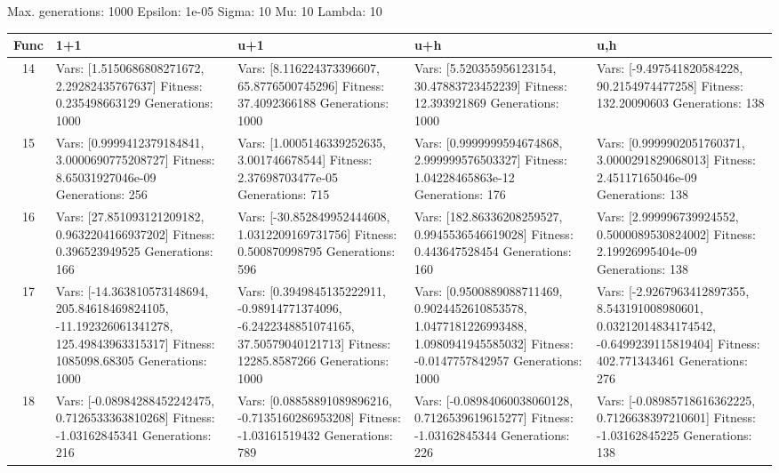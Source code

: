 \documentclass[landscape,11pt]{article}
\begin{document}
\newpage
Max. generations: 1000 Epsilon: 1e-05 Sigma: 10 Mu: 10 Lambda: 10 \\
\begin{tabular}{|c|p{5.4cm}|p{5.4cm}|p{5.4cm}|p{5.4cm}|}
\hline
Func & 1+1 & u+1 & u+h & u,h \\ 
\hline 14 & Vars: [1.5150686808271672, 2.29282435767637] Fitness: 0.235498663129 Generations: 1000 & Vars: [8.116224373396607, 65.8776500745296] Fitness: 37.4092366188 Generations: 1000 & Vars: [5.520355956123154, 30.47883723452239] Fitness: 12.393921869 Generations: 1000 & Vars: [-9.497541820584228, 90.2154974477258] Fitness: 132.20090603 Generations: 138 \\
 \hline 
 15 & Vars: [0.9999412379184841, 3.0000690775208727] Fitness: 8.65031927046e-09 Generations: 256 & Vars: [1.0005146339252635, 3.001746678544] Fitness: 2.37698703477e-05 Generations: 715 & Vars: [0.9999999594674868, 2.999999576503327] Fitness: 1.04228465863e-12 Generations: 176 & Vars: [0.9999902051760371, 3.0000291829068013] Fitness: 2.45117165046e-09 Generations: 138 \\
 \hline 
 16 & Vars: [27.851093121209182, 0.9632204166937202] Fitness: 0.396523949525 Generations: 166 & Vars: [-30.852849952444608, 1.0312209169731756] Fitness: 0.500870998795 Generations: 596 & Vars: [182.86336208259527, 0.9945536546619028] Fitness: 0.443647528454 Generations: 160 & Vars: [2.999996739924552, 0.5000089530824002] Fitness: 2.19926995404e-09 Generations: 138 \\
 \hline 
 17 & Vars: [-14.363810573148694, 205.84618469824105, -11.192326061341278, 125.49843963315317] Fitness: 1085098.68305 Generations: 1000 & Vars: [0.3949845135222911, -0.98914771374096, -6.2422348851074165, 37.50579040121713] Fitness: 12285.8587266 Generations: 1000 & Vars: [0.9500889088711469, 0.9024452610853578, 1.0477181226993488, 1.0980941945585032] Fitness: -0.0147757842957 Generations: 1000 & Vars: [-2.9267963412897355, 8.543191008980601, 0.03212014834174542, -0.6499239115819404] Fitness: 402.771343461 Generations: 276 \\
 \hline 
 18 & Vars: [-0.08984288452242475, 0.7126533363810268] Fitness: -1.03162845341 Generations: 216 & Vars: [0.08858891089896216, -0.7135160286953208] Fitness: -1.03161519432 Generations: 789 & Vars: [-0.08984060038060128, 0.7126539619615277] Fitness: -1.03162845344 Generations: 226 & Vars: [-0.08985718616362225, 0.7126638397210601] Fitness: -1.03162845225 Generations: 138 \\
 \hline 
\end{tabular}
\end{document}
